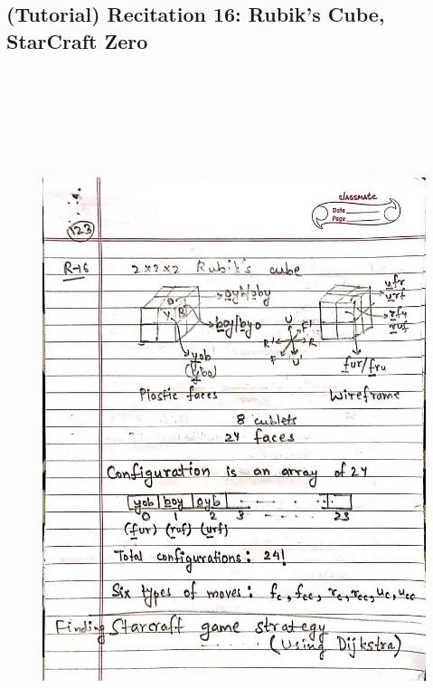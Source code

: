 \newpage
{\color{black} \subsection*{(Tutorial) Recitation 16: Rubik's Cube, StarCraft Zero}}
\begin{figure}[H]
    \centering
    \includegraphics[width=16cm, height=21cm]{"./MIT-6.006/MIT-6006-123"}
\end{figure}

